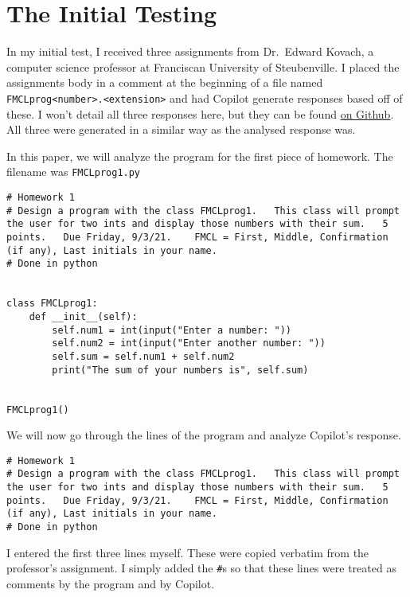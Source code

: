 \documentclass[12pt]{article}
\begin{document}
\hypertarget{the-initial-testing}{%
\section{The Initial Testing}\label{the-initial-testing}}

In my initial test, I received three assignments from Dr.~Edward Kovach,
a computer science professor at Franciscan University of Steubenville. I
placed the assignments body in a comment at the beginning of a file
named
\texttt{FMCLprog\textless{}number\textgreater{}.\textless{}extension\textgreater{}}
and had Copilot generate responses based off of these. I won't detail
all three responses here, but they can be found
\href{https://github.com/2br-2b/Github-Copilot-Project/tree/master/Scholarly\%20Testing/}{on
Github}. All three were generated in a similar way as the analysed
response was.

In this paper, we will analyze the program for the first piece of
homework. The filename was \texttt{FMCLprog1.py}

\begin{lstlisting}
# Homework 1 
# Design a program with the class FMCLprog1.   This class will prompt the user for two ints and display those numbers with their sum.   5 points.   Due Friday, 9/3/21.    FMCL = First, Middle, Confirmation (if any), Last initials in your name. 
# Done in python 


class FMCLprog1:
    def __init__(self):
        self.num1 = int(input("Enter a number: "))
        self.num2 = int(input("Enter another number: "))
        self.sum = self.num1 + self.num2
        print("The sum of your numbers is", self.sum)


FMCLprog1()
\end{lstlisting}


We will now go through the lines of the program and analyze Copilot's
response.

\begin{lstlisting}
# Homework 1 
# Design a program with the class FMCLprog1.   This class will prompt the user for two ints and display those numbers with their sum.   5 points.   Due Friday, 9/3/21.    FMCL = First, Middle, Confirmation (if any), Last initials in your name. 
# Done in python 
\end{lstlisting} 

I entered the first three lines myself. These were copied verbatim from
the professor's assignment. I simply added the \texttt{\#}s so that
these lines were treated as comments by the program and by Copilot.
\end{document}
